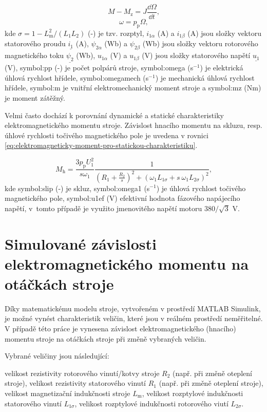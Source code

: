 \documentclass[a4paper, twoside, 11pt]{article}
\begin{document}
\begin{equation}
    M - M_\text{z} = J \frac{\dd{\Omega}}{\dd{t}},
\end{equation}
\begin{equation}
    \omega = p_\text{p} \Omega,
\end{equation}
kde $\sigma = 1 - L_\text{m}^{2}/(L_1 L_2)$ (-) je tzv. rozptyl, $i_{1\alpha}$ (A) a $i_{1\beta}$ (A) jsou složky vektoru statorového proudu $\underline{i_1}$ (A), $\psi_{2\alpha}$ (Wb) a $\psi_{2\beta}$ (Wb) jsou složky vektoru rotorového magnetického toku $\underline{\psi_2}$ (Wb), $u_{1\alpha}$ (V) a $u_{1\beta}$ (V) jsou složky statorového napětí $\underline{u_1}$ (V), \gls{symbol:pp} (-) je počet polpárů stroje, \gls{symbol:omega} (s$^{-1}$) je elektrická úhlová rychlost hřídele, \gls{symbol:omegamech} (s$^{-1}$) je mechanická úhlová rychlost hřídele, \gls{symbol:m} je vnitřní elektromechanický moment stroje a \gls{symbol:mz} (Nm) je moment zátěžný.\par

Velmi často dochází k porovnání dynamické a statické charakteristiky elektromagnetického momentu stroje. Závislost hnacího momentu na skluzu, resp. úhlové rychlosti točivého magnetického pole je uvedena v rovnici \ref{eq:elektromagneticky-moment-pro-statickou-charakteristiku}.

 \begin{equation}\label{eq:elektromagneticky-moment-pro-statickou-charakteristiku}
            M_\text{h} = \frac{3 p_\text{p} U_\text{1}^{2}}{s \omega_1} \frac{1}{(R_1 + \frac{R_2}{s})^{2} + (\omega_1 L_{1\sigma} + s~\omega_1 L_{2\sigma})^{2}},
        \end{equation}
        kde \gls{symbol:slip} (-) je skluz, \gls{symbol:omega1} (s$^{-1}$) je úhlová rychlost točivého magnetického pole, \gls{symbol:u1ef} (V) efektivní hodnota fázového napájecího napětí, v~tomto případě je využito jmenovitého napětí motoru $380/\sqrt{3}$ V.


\section{Simulované závislosti elektromagnetického momentu na otáčkách stroje}
    Díky matematickému modelu stroje, vytvořeném v prostředí MATLAB Simulink, je možné vynést charakteristik veličin, které jsou v reálném prostředí neměřitelné. V případě této práce je vynesena závislost elektromagnetického (hnacího) momentu stroje na otáčkách stroje při změně vybraných veličin.\par
    Vybrané veličiny jsou následující:
    \begin{itemize}
            velikost rezistivity rotorového vinutí/kotvy stroje $R_2$ (např. při změně oteplení stroje),
            velikost rezistivity statorového vinutí $R_1$ (např. při změně oteplení stroje),
            velikost magnetizační indukčnosti stroje $L_\text{m}$,
            velikost rozptylové indukčnosti statorového vinutí $L_{1\sigma}$,
            velikost rozptylové indukčnosti rotorového viutí $L_{2\sigma}$.
    \end{itemize}
\end{document}
